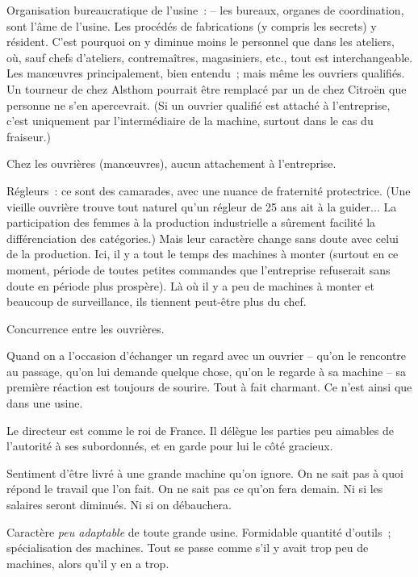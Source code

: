 \documentclass[french,twoside]{book} %
\begin{document}
\noindent \par
Organisation bureaucratique de l'usine : – les bureaux, organes de coordination, sont l'âme de l'usine. Les procédés de fabrications (y compris les secrets) y résident. C'est pourquoi on y diminue moins le personnel que dans les ateliers, où, sauf chefs d'ateliers, contremaîtres, magasiniers, etc., tout est interchangeable. Les manœuvres principalement, bien entendu ; mais même les ouvriers qualifiés. Un tourneur de chez Alsthom pourrait être remplacé par un de chez Citroën que personne ne s'en apercevrait. (Si un ouvrier qualifié est attaché à l'entreprise, c'est uniquement par l'intermédiaire de la machine, surtout dans le cas du fraiseur.)\par
Chez les ouvrières (manœuvres), aucun attachement à l'entreprise.\par
Régleurs : ce sont des camarades, avec une nuance de fraternité protectrice. (Une vieille ouvrière trouve tout naturel qu'un régleur de 25 ans ait à la guider... La participation des femmes à la production industrielle a sûrement facilité la différenciation des catégories.) Mais leur caractère change sans doute avec celui de la production. Ici, il y a tout le temps des machines à monter (surtout en ce moment, période de toutes petites commandes que l'entreprise refuserait sans doute en période plus prospère). Là où il y a peu de machines à monter et beaucoup de surveillance, ils tiennent peut-être plus du chef.\par
Concurrence entre les ouvrières.\par
Quand on a l'occasion d'échanger un regard avec un ouvrier – qu'on le rencontre au passage, qu'on lui demande quelque chose, qu'on le regarde à sa machine – sa première réaction est toujours de sourire. Tout à fait charmant. Ce n'est ainsi que dans une usine.\par
Le directeur est comme le roi de France. Il délègue les parties peu aimables de l'autorité à ses subordonnés, et en garde pour lui le côté gracieux.\par
Sentiment d'être livré à une grande machine qu'on ignore. On ne sait pas à quoi répond le travail que l'on fait. On ne sait pas ce qu'on fera demain. Ni si les salaires seront diminués. Ni si on débauchera.\par
Caractère {\itshape peu adaptable} de toute grande usine. Formidable quantité d'outils ; spécialisation des machines. Tout se passe comme s'il y avait trop peu de machines, alors qu'il y en a trop.\par
\end{document}
